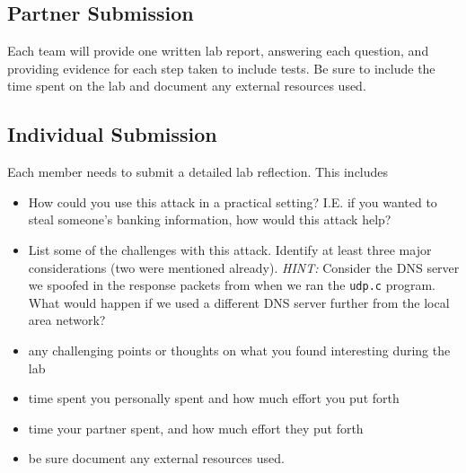 \subsection{Partner Submission}
Each team will provide one written lab report, answering each question, and providing evidence for each step taken to include tests. Be sure to include the time spent on the lab and document any external resources used. 

\subsection{Individual Submission}
Each member needs to submit a detailed lab reflection. This includes 
\begin{itemize}
\item How could you use this attack in a practical setting?  I.E. if you wanted to steal someone's banking information, how would this attack help?
\item List some of the challenges with this attack.  Identify at least three major considerations (two were mentioned already).  {\em HINT:} Consider the DNS server we spoofed in the response packets from when we ran the {\tt udp.c} program.  What would happen if we used a different DNS server further from the local area network? 
\item any challenging points or thoughts on what you found interesting during the lab 
\item time spent you personally spent and how much effort you put forth
\item time your partner spent, and how much effort they put forth
\item be sure document any external resources used. 
\end{itemize}


